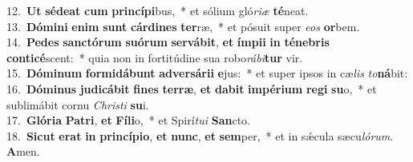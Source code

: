 {12.~}\textbf{Ut} \textbf{sé}\textbf{de}\textbf{at} \textbf{cum} \textbf{prin}\textbf{cí}\textbf{pi}bus,~* et sólium gló\textit{ri}\textit{æ} \textbf{té}neat.\\
{13.~}\textbf{Dó}\textbf{mi}\textbf{ni} \textbf{e}\textbf{nim} \textbf{sunt} \textbf{cár}\textbf{di}\textbf{nes} \textbf{ter}ræ,~* et pósuit super \textit{e}\textit{os} \textbf{or}bem.\\
{14.~}\textbf{Pe}\textbf{des} \textbf{san}\textbf{ctó}\textbf{rum} \textbf{su}\textbf{ó}\textbf{rum} \textbf{ser}\textbf{vá}\textbf{bit}, \textbf{et} \textbf{ím}\textbf{pi}\textbf{i} \textbf{in} \textbf{té}\textbf{ne}\textbf{bris} \textbf{con}\textbf{ti}\textbf{cé}scent:~* quia non in fortitúdine sua robo\textit{rá}\textit{bi}\textbf{tur} vir.\\
{15.~}\textbf{Dó}\textbf{mi}\textbf{num} \textbf{for}\textbf{mi}\textbf{dá}\textbf{bunt} \textbf{ad}\textbf{ver}\textbf{sá}\textbf{ri}\textbf{i} \textbf{e}jus:~* et super ipsos in cæ\textit{lis} \textit{to}\textbf{ná}bit:\\
{16.~}\textbf{Dó}\textbf{mi}\textbf{nus} \textbf{ju}\textbf{di}\textbf{cá}\textbf{bit} \textbf{fi}\textbf{nes} \textbf{ter}\textbf{ræ}, \textbf{et} \textbf{da}\textbf{bit} \textbf{im}\textbf{pé}\textbf{ri}\textbf{um} \textbf{re}\textbf{gi} \textbf{su}o,~* et sublimábit cornu \textit{Chri}\textit{sti} \textbf{su}i.\\
{17.~}\textbf{Gló}\textbf{ri}\textbf{a} \textbf{Pa}\textbf{tri}, \textbf{et} \textbf{Fí}\textbf{li}o,~* et Spirí\textit{tu}\textit{i} \textbf{San}cto.\\
{18.~}\textbf{Si}\textbf{cut} \textbf{e}\textbf{rat} \textbf{in} \textbf{prin}\textbf{cí}\textbf{pi}\textbf{o}, \textbf{et} \textbf{nunc}, \textbf{et} \textbf{sem}per,~* et in sǽcula sæcu\textit{ló}\textit{rum}. \textbf{A}men.\\
